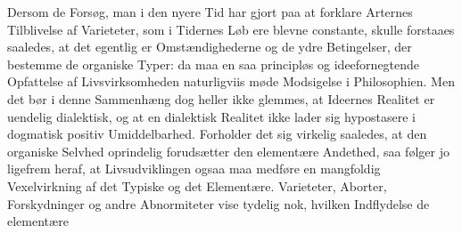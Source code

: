 \documentclass[11pt]{book}
\begin{document}
Dersom de Forsøg, man i den nyere Tid har gjort paa at forklare
Arternes Tilblivelse af Varieteter, som i Tidernes Løb ere blevne
constante, skulle forstaaes saaledes, at det egentlig er
Omstændighederne og de ydre Betingelser, der bestemme de organiske
Typer: da maa en saa principløs og ideefornegtende Opfattelse af
Livsvirksomheden naturligviis møde Modsigelse i Philosophien. Men
det bør i denne Sammenhæng dog heller ikke glemmes, at Ideernes
Realitet er uendelig dialektisk, og at en dialektisk Realitet ikke lader
sig hypostasere i dogmatisk positiv Umiddelbarhed. Forholder det sig
virkelig saaledes, at den organiske Selvhed oprindelig forudsætter den
elementære Andethed, saa følger jo ligefrem heraf, at Livsudviklingen
ogsaa maa medføre en mangfoldig Vexelvirkning af det Typiske og det
Elementære. Varieteter, Aborter, Forskydninger og andre
Abnormiteter vise tydelig nok, hvilken Indflydelse de elementære
\end{document}
